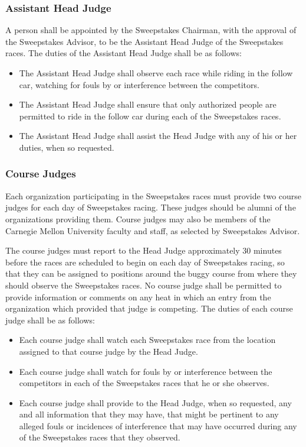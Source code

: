 \subsubsection{Assistant Head Judge}

A person shall be appointed by the Sweepstakes Chairman, with the approval of the Sweepstakes Advisor, to be the Assistant Head Judge of the Sweepstakes races. The duties of the Assistant Head Judge shall be as follows:
\begin{itemize}
	\item The Assistant Head Judge shall observe each race while riding in the follow car, watching for fouls by or interference between the competitors.
	\item The Assistant Head Judge shall ensure that only authorized people are permitted to ride in the follow car during each of the Sweepstakes races.
	\item The Assistant Head Judge shall assist the Head Judge with any of his or her duties, when so requested.
\end{itemize}

\subsubsection{Course Judges}

Each organization participating in the Sweepstakes races must provide two course judges for each day of Sweepstakes racing. These judges should be alumni of the organizations providing them. Course judges may also be members of the Carnegie Mellon University faculty and staff, as selected by Sweepstakes Advisor.

The course judges must report to the Head Judge approximately 30 minutes before the races are scheduled to begin on each day of Sweepstakes racing, so that they can be assigned to positions around the buggy course from where they should observe the Sweepstakes races. No course judge shall be permitted to provide information or comments on any heat in which an entry from the organization which provided that judge is competing. The duties of each course judge shall be as follows:
\begin{itemize}
	\item Each course judge shall watch each Sweepstakes race from the location assigned to that course judge by the Head Judge.
	\item Each course judge shall watch for fouls by or interference between the competitors in each of the Sweepstakes races that he or she observes.
	\item Each course judge shall provide to the Head Judge, when so requested, any and all information that they may have, that might be pertinent to any alleged fouls or incidences of interference that may have occurred during any of the Sweepstakes races that they observed.
\end{itemize}

